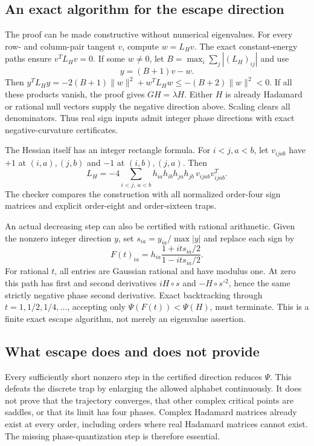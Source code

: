 \subsection{An exact algorithm for the escape direction}
The proof can be made constructive without numerical eigenvalues.
For every row- and column-pair tangent $v$, compute $w=L_Hv$.
The exact constant-energy paths ensure $v^TL_Hv=0$.
If some $w\ne0$, let
$B=\max_i\sum_j|(L_H)_{ij}|$ and use
\[
 y=(B+1)v-w.
\]
Then
$y^TL_Hy=-2(B+1)\|w\|^2+w^TL_Hw
\le-(B+2)\|w\|^2<0$.
If all these products vanish, the proof gives $GH=\lambda H$.
Either $H$ is already Hadamard or rational null vectors supply
the negative direction above. Scaling clears all denominators.
Thus real sign inputs admit integer phase directions with exact
negative-curvature certificates.

The Hessian itself has an integer rectangle formula. For
$i<j,a<b$, let $v_{ijab}$ have $+1$ at $(i,a),(j,b)$ and
$-1$ at $(i,b),(j,a)$. Then
\[
 L_H=-4\sum_{i<j,\ a<b}
 h_{ia}h_{ib}h_{ja}h_{jb}\,v_{ijab}v_{ijab}^T.
\]
The checker compares the construction with all normalized order-four
sign matrices and explicit order-eight and order-sixteen traps.

An actual decreasing step can also be certified with rational
arithmetic. Given the nonzero integer direction $y$, set
$s_{ia}=y_{ia}/\max|y|$ and replace each sign by
\[
 F(t)_{ia}=h_{ia}\frac{1+it s_{ia}/2}{1-it s_{ia}/2}.
\]
For rational $t$, all entries are Gaussian rational and have modulus
one. At zero this path has first and second derivatives $iH\circ s$
and $-H\circ s^{\circ2}$, hence the same strictly negative phase
second derivative. Exact backtracking through $t=1,1/2,1/4,\ldots$,
accepting only $\Psi(F(t))<\Psi(H)$, must terminate. This is a
finite exact escape algorithm, not merely an eigenvalue assertion.

\subsection{What escape does and does not provide}
Every sufficiently short nonzero step in the certified direction
reduces $\Psi$. This defeats the discrete trap by enlarging the
allowed alphabet continuously. It does not prove that the trajectory
converges, that other complex critical points are saddles, or that its
limit has four phases. Complex Hadamard matrices already exist at
every order, including orders where real Hadamard matrices cannot exist.
The missing phase-quantization step is therefore essential.

